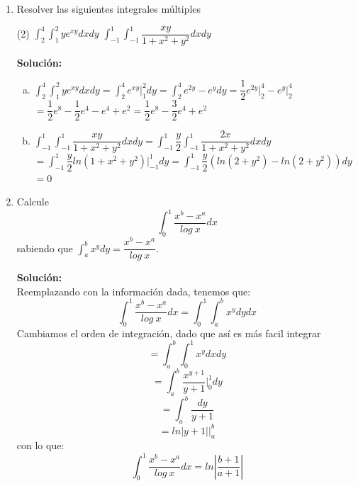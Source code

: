 \documentclass[12pt]{article}
\newenvironment{solucion}
{\begin{mdframed}[backgroundcolor=black!10]
		{\bf Solución:}\\
	}
	{
	\end{mdframed}
}
\newenvironment{preguntas}
{\begin{enumerate}\itemsep12pt
	}
	{
	\end{enumerate}
}
\newcommand{\ev}{\Big|}
\begin{document}
\begin{preguntas}
\begin{solucion}
\end{solucion}
\item Resolver las siguientes integrales múltiples
\begin{tasks}(2)
\task $\displaystyle\int_2^4 \displaystyle\int_1^2 ye^{xy}dxdy$
\task $\displaystyle\int_{-1}^1\displaystyle\int_{-1}^1 \dfrac{xy}{1+x^2+y^2}dxdy$
\end{tasks}
\begin{solucion}

\begin{enumerate}[a)]
\item $\displaystyle\int_2^4 \displaystyle\int_1^2 ye^{xy}dxdy = 
			\displaystyle\int_2^4 e^{xy} \ev_1^2 dy = 
			\displaystyle\int_2^4 e^{2y} - e^{y} dy =
			\dfrac{1}{2}e^{2y}\ev_2^4 - e^{y}\ev_2^4$\\
			$=\dfrac{1}{2}e^8 - \dfrac{1}{2}e^4 - e^4 + e^2 =
			\dfrac{1}{2}e^8 - \dfrac{3}{2}e^4 + e^2$	
\item $\displaystyle\int_{-1}^1\displaystyle\int_{-1}^1 \dfrac{xy}{1+x^2+y^2}dxdy = 
			\displaystyle\int_{-1}^1 \dfrac{y}{2} \displaystyle\int_{-1}^1 \dfrac{2x}{1+x^2+y^2}dxdy$\\
			$= \displaystyle\int_{-1}^1 \dfrac{y}{2} ln(1+x^2+y^2) \ev_{-1}^1 dy = 
			\displaystyle\int_{-1}^1 \dfrac{y}{2}( ln(2+y^2) - ln(2+y^2) ) dy$\\
			$=0$
\end{enumerate}
\end{solucion}
\item Calcule
	$$ \displaystyle\int_0^1 \dfrac{x^b - x^a}{log\ x}dx$$
	sabiendo que $\displaystyle\int_a^b x^y dy = \dfrac{x^b - x^a}{log\ x}$.
\begin{solucion}
Reemplazando con la información dada, tenemos que:
		$$ \displaystyle\int_0^1 \dfrac{x^b - x^a}{log\ x}dx = \displaystyle\int_0^1 \displaystyle\int_a^b x^y dydx $$
		Cambiamos el orden de integración, dado que así es más facil integrar
		$$ = \displaystyle\int_a^b \displaystyle\int_0^1 x^y dxdy $$
		$$ = \displaystyle\int_a^b \dfrac{x^{y+1}}{y+1} \ev_0^1 dy $$
		$$ = \displaystyle\int_a^b \dfrac{dy}{y+1} $$
		$$ = ln|y+1|\ev_a^b $$
		con lo que:
		$$ \displaystyle\int_0^1 \dfrac{x^b - x^a}{log\ x}dx = ln\left|\dfrac{b+1}{a+1}\right| $$
\end{solucion}
\end{preguntas}
\end{document}
